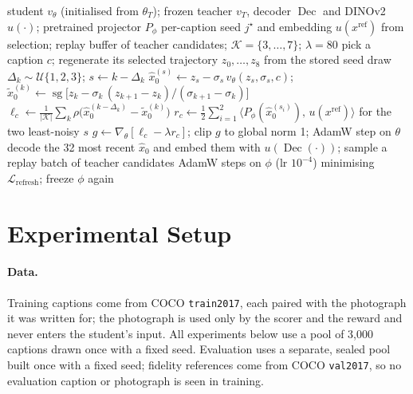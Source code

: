 \documentclass{article} %
\DeclareMathOperator{\Dec}{Dec}
\DeclareMathOperator{\sgop}{sg}
\begin{document}
\begin{algorithm}[t]
\caption{One training update of the student (repeat until the schedule ends)}
\label{alg:train}
\begin{algorithmic}[1]
\Require student $v_\theta$ (initialised from $\theta_T$); frozen teacher $v_T$, decoder $\Dec$ and DINOv2 $u(\cdot)$; pretrained projector $P_\phi$
\Statex \hspace{\algorithmicindent} per-caption seed $j^\star$ and embedding $u(x^{\mathrm{ref}})$ from selection; replay buffer of teacher candidates; $\mathcal K=\{3,\dots,7\}$; $\lambda{=}80$
\State pick a caption $c$; regenerate its selected trajectory $z_0,\dots,z_8$ from the stored seed 
 
  \State draw $\Delta_k\sim\mathcal U\{1,2,3\}$; $s\gets k-\Delta_k$
  \State $\hat x_0^{(s)}\gets z_s-\sigma_s\,v_\theta(z_s,\sigma_s,c)$;\quad $\tilde x_0^{(k)}\gets\sgop\big[z_k-\sigma_k\,(z_{k+1}-z_k)/(\sigma_{k+1}-\sigma_k)\big]$
\EndFor
\State $\ell_c\gets\frac{1}{|\mathcal K|}\sum_{k}\rho\big(\hat x_0^{(k-\Delta_k)}-\tilde x_0^{(k)}\big)$ 
\State $r_c\gets\frac12\sum_{i=1}^{2}\langle P_\phi(\hat x_0^{(s_i)}),\,u(x^{\mathrm{ref}})\rangle$ for the two least-noisy $s$ 
\State $g\gets\nabla_\theta[\ell_c-\lambda r_c]$; clip $g$ to global norm 1; AdamW step on $\theta$ 
 
  \State decode the 32 most recent $\hat x_0$ and embed them with $u(\Dec(\cdot))$; sample a replay batch of teacher candidates
   AdamW steps on $\phi$ (lr $10^{-4}$) minimising $\mathcal L_{\mathrm{refresh}}$; freeze $\phi$ again
\EndIf
\end{algorithmic}
\end{algorithm}

\section{Experimental Setup}
\label{sec:setup}

\paragraph{Data.} Training captions come from COCO \texttt{train2017}, each paired with the photograph it
was written for; the photograph is used only by the scorer and the reward and never enters the student's
input. All experiments below use a pool of 3,000 captions drawn once with a fixed seed. Evaluation uses a
separate, sealed pool built once with a fixed seed; fidelity references come from COCO \texttt{val2017}, so
no evaluation caption or photograph is seen in training.
\end{document}
